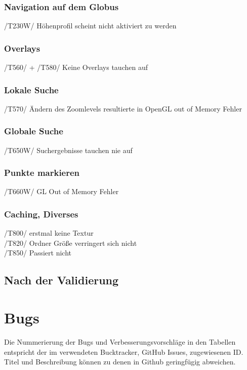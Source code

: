 \documentclass[10pt]{scrreprt}
\begin{document}
\subsection{Navigation auf dem Globus}
/T230W/ Höhenprofil scheint nicht aktiviert zu werden
\subsection{Overlays}
/T560/ + /T580/ Keine Overlays tauchen auf
\subsection{Lokale Suche}
/T570/ Ändern des Zoomlevels resultierte in OpenGL out of Memory Fehler
\subsection{Globale Suche}
/T650W/ Suchergebnisse tauchen nie auf
\subsection{Punkte markieren}
/T660W/ GL Out of Memory Fehler
\subsection{Caching, Diverses}
/T800/ erstmal keine Textur \\
/T820/ Ordner Größe verringert sich nicht \\
/T850/ Passiert nicht \\

\section{Nach der Validierung}

\chapter{Bugs}
Die Nummerierung der Bugs und Verbesserungsvorschläge in den Tabellen entspricht der im verwendeten Bucktracker, GitHub Issues, zugewiesenen ID.
Titel und Beschreibung können zu denen in Github geringfügig abweichen.\\
\end{document}
